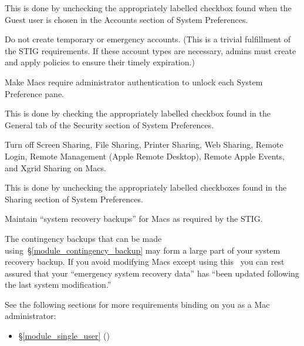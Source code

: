 This is done by unchecking the appropriately labelled checkbox found when
the Guest user is chosen in the Accounts section of System Preferences.

%
Do not create temporary or emergency accounts. (This is a trivial
fulfillment of the STIG requirements. If these account types are
necessary, admins must create and apply policies to ensure their
timely expiration.)


%
Make Macs require administrator authentication to unlock each System
Preference pane.

This is done by checking the appropriately labelled checkbox found in the
General tab of the Security section of System Preferences.

%
%
%
Turn off Screen Sharing, File Sharing, Printer Sharing, Web Sharing,
Remote Login, Remote Management (Apple Remote Desktop), Remote Apple
Events, and Xgrid Sharing on Macs.

This is done by unchecking the appropriately labelled checkboxes found in
the Sharing section of System Preferences.

%
Maintain ``system recovery backups'' for Macs as required by the STIG.

The contingency backups that can be made
using~\S\ref{module_contingency_backup} may form a large part of your
system recovery backup. If you avoid modifying Macs except using this
\CMITSPolicy\, you can rest assured that your ``emergency system recovery
data'' has ``been updated following the last system modification.''

See the following sections for more requirements binding on you as a
Mac administrator:
\begin{itemize}
\item \S\ref{module_single_user} ()
\end{itemize}
